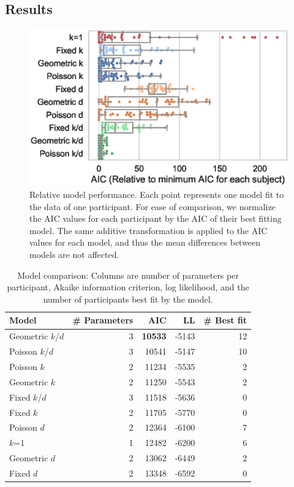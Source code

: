 \documentclass[10pt,letterpaper]{article}
\begin{document}
\subsection{Results}

\begin{figure}[t!]
  \centering
  \includegraphics[scale=0.55]{model-fits}
  \caption{Relative model performance. Each point represents one model fit to the data of one participant. For ease of comparison, we normalize the AIC values for each participant by the AIC of their best fitting model. The same additive transformation is applied to the AIC values for each model, and thus the mean differences between models are not affected.} 
  \label{fig:model-fits}
\end{figure}

\begin{table}[t!]
  \centering
  \begin{tabular}{lrrrr}
  \toprule
  Model         & \# Parameters & AIC   & LL    & \# Best fit \\
  \midrule
  Geometric $k$/$d$ & 3 & \textbf{10533} & -5143 & 12 \\
  Poisson $k$/$d$ & 3 & 10541 & -5147 & 10 \\
  Poisson $k$ & 2 & 11234 & -5535 & 2 \\
  Geometric $k$ & 2 & 11250 & -5543 & 2 \\
  Fixed $k$/$d$ & 3 & 11518 & -5636 & 0 \\
  Fixed $k$ & 2 & 11705 & -5770 & 0 \\
  Poisson $d$ & 2 & 12364 & -6100 & 7 \\
  $k$=1 & 1 & 12482 & -6200 & 6 \\
  Geometric $d$ & 2 & 13062 & -6449 & 2 \\
  Fixed $d$ & 2 & 13348 & -6592 & 0 \\
  \bottomrule
  \end{tabular}
  \caption{Model comparison: Columns are number of parameters per participant, Akaike information criterion, log likelihood, and the number of participants best fit by the model.}
  \label{tab:model-fits}
\end{table}
\end{document}
